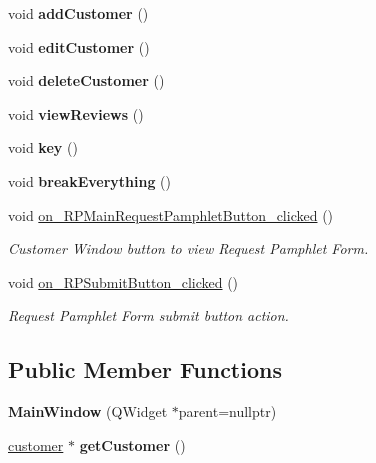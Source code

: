 \begin{DoxyCompactItemize}
void {\bfseries add\+Customer} ()
\item 
\mbox{\label{class_main_window_afff9ca5b1b867af6b54eb1c8d9501522}} 
void {\bfseries edit\+Customer} ()
\item 
\mbox{\label{class_main_window_a95365ee88b53639217f8463916a15da4}} 
void {\bfseries delete\+Customer} ()
\item 
\mbox{\label{class_main_window_a2a5b8c23beabae0461b4356ad2a0b14f}} 
void {\bfseries view\+Reviews} ()
\item 
\mbox{\label{class_main_window_af9b5f9919c32f23211364ac62f55df91}} 
void {\bfseries key} ()
\item 
\mbox{\label{class_main_window_af87f2e8818e039003c7f8e0d69ba8544}} 
void {\bfseries break\+Everything} ()
\item 
void \mbox{\hyperlink{class_main_window_ab27be7a4e38509990a9e2bbb0d77f26c}{on\+\_\+\+R\+P\+Main\+Request\+Pamphlet\+Button\+\_\+clicked}} ()
\begin{DoxyCompactList}\small\item\em Customer Window button to view Request Pamphlet Form. \end{DoxyCompactList}\item 
void \mbox{\hyperlink{class_main_window_ad8dc42f06d44432f03794e52d3970d19}{on\+\_\+\+R\+P\+Submit\+Button\+\_\+clicked}} ()
\begin{DoxyCompactList}\small\item\em Request Pamphlet Form submit button action. \end{DoxyCompactList}\end{DoxyCompactItemize}
\subsection*{Public Member Functions}
\begin{DoxyCompactItemize}
\item 
\mbox{\label{class_main_window_a996c5a2b6f77944776856f08ec30858d}} 
{\bfseries Main\+Window} (Q\+Widget $\ast$parent=nullptr)
\item 
\mbox{\label{class_main_window_a6dff16b4a5343ec7d147afbb566c2638}} 
\mbox{\hyperlink{classcustomer}{customer}} $\ast$ {\bfseries get\+Customer} ()
\end{DoxyCompactItemize}


